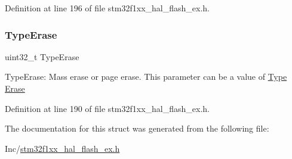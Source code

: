 Definition at line 196 of file stm32f1xx\+\_\+hal\+\_\+flash\+\_\+ex.\+h.

\mbox{\label{struct_f_l_a_s_h___erase_init_type_def_ae2154c09320f3ef7feb8f4a84e9ac17b}} 
\subsubsection{\texorpdfstring{Type\+Erase}{TypeErase}}
{\footnotesize\ttfamily uint32\+\_\+t Type\+Erase}

Type\+Erase\+: Mass erase or page erase. This parameter can be a value of \hyperlink{group___f_l_a_s_h_ex___type___erase}{Type Erase} 

Definition at line 190 of file stm32f1xx\+\_\+hal\+\_\+flash\+\_\+ex.\+h.



The documentation for this struct was generated from the following file\+:\begin{DoxyCompactItemize}
\item 
Inc/\hyperlink{stm32f1xx__hal__flash__ex_8h}{stm32f1xx\+\_\+hal\+\_\+flash\+\_\+ex.\+h}\end{DoxyCompactItemize}
